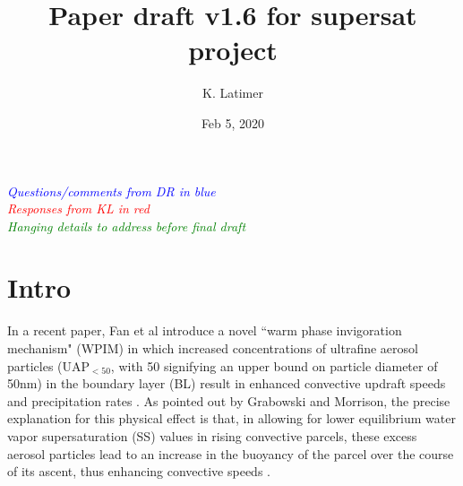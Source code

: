 \documentclass{article}
\title{Paper draft v1.6 for supersat project}
\author{K. Latimer}
\date{Feb 5, 2020}
\newcommand{\drcomm}[1]{\textcolor{blue}{\textit{#1}}}
\newcommand{\klcomm}[1]{\textcolor{red}{\textit{#1}}}
\newcommand{\todo}[1]{\textcolor{green}{\textit{#1}}}
\begin{document}
\maketitle

\noindent\drcomm{Questions/comments from DR in blue} \\
\noindent\klcomm{Responses from KL in red}\\
\noindent\todo{Hanging details to address before final draft}\\

\section{Intro}

In a recent paper, Fan et al introduce a novel ``warm phase invigoration mechanism" (WPIM) in which increased concentrations of ultrafine aerosol particles (UAP$_{<50}$, with 50 signifying an upper bound on particle diameter of 50nm) in the boundary layer (BL) result in enhanced convective updraft speeds and precipitation rates \cite{Fan2018}. As pointed out by Grabowski and Morrison, the precise explanation for this physical effect is that, in allowing for lower equilibrium water vapor supersaturation (SS) values in rising convective parcels, these excess aerosol particles lead to an increase in the buoyancy of the parcel over the course of its ascent, thus enhancing convective speeds \cite{Grabowski2020}.
\end{document}
